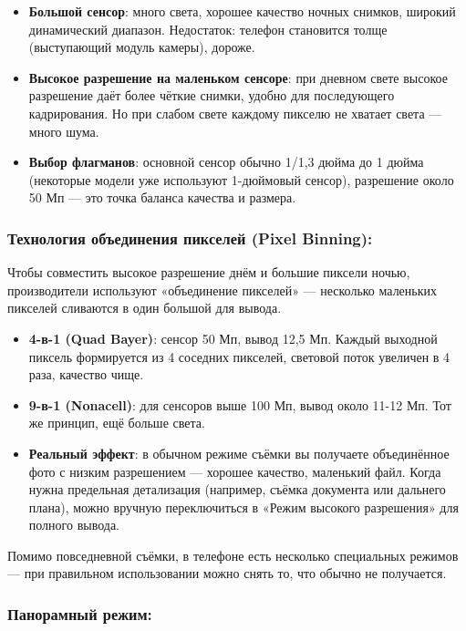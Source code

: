 \begin{itemize}
  \item \textbf{Большой сенсор}: много света, хорошее качество ночных снимков, широкий динамический диапазон. Недостаток: телефон становится толще (выступающий модуль камеры), дороже.
  \item \textbf{Высокое разрешение на маленьком сенсоре}: при дневном свете высокое разрешение даёт более чёткие снимки, удобно для последующего кадрирования. Но при слабом свете каждому пикселю не хватает света — много шума.
  \item \textbf{Выбор флагманов}: основной сенсор обычно 1/1,3 дюйма до 1 дюйма (некоторые модели уже используют 1-дюймовый сенсор), разрешение около 50 Мп — это точка баланса качества и размера.
\end{itemize}

\subsubsection*{Технология объединения пикселей (Pixel Binning):}

Чтобы совместить высокое разрешение днём и большие пиксели ночью, производители используют «объединение пикселей» — несколько маленьких пикселей сливаются в один большой для вывода.

\begin{itemize}
  \item \textbf{4-в-1 (Quad Bayer)}: сенсор 50 Мп, вывод 12,5 Мп. Каждый выходной пиксель формируется из 4 соседних пикселей, световой поток увеличен в 4 раза, качество чище.
  \item \textbf{9-в-1 (Nonacell)}: для сенсоров выше 100 Мп, вывод около 11-12 Мп. Тот же принцип, ещё больше света.
  \item \textbf{Реальный эффект}: в обычном режиме съёмки вы получаете объединённое фото с низким разрешением — хорошее качество, маленький файл. Когда нужна предельная детализация (например, съёмка документа или дальнего плана), можно вручную переключиться в «Режим высокого разрешения» для полного вывода.
\end{itemize}


Помимо повседневной съёмки, в телефоне есть несколько специальных режимов — при правильном использовании можно снять то, что обычно не получается.

\subsubsection*{Панорамный режим:}

